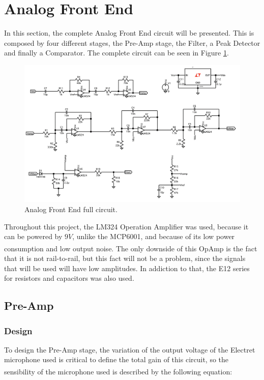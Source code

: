 \section{Analog Front End}

In this section, the complete Analog Front End circuit will be presented. This is composed by four different stages, the Pre-Amp stage, the Filter, a Peak Detector and finally a Comparator. The complete circuit can be seen in Figure \ref{fig:CompleteAFE}.

\begin{figure}[H]
    \centering
    \includegraphics*[scale = 0.45]{Images/CompleteAFE.png}
    \caption{Analog Front End full circuit.}
    \label{fig:CompleteAFE}
\end{figure}

Throughout this project, the LM324 Operation Amplifier was used, because it can be powered by $9V$, unlike the MCP6001, and because of its low power consumption and low output noise\textsuperscript{\cite{lm324-datasheet}}. The only downside of this OpAmp is the fact that it is not rail-to-rail, but this fact will not be a problem, since the signals that will be used will have low amplitudes. In addiction to that, the E12 series for resistors and capacitors was also used. 
\subsection{Pre-Amp}

\subsubsection{Design}

To design the Pre-Amp stage, the variation of the output voltage of the Electret microphone used is critical to define the total gain of this circuit, so the sensibility of the microphone used is described by the following equation\textsuperscript{\cite{Lab-statement}}:

